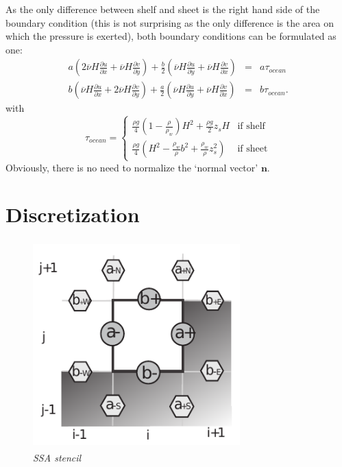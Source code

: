 \documentclass[a4paper,10pt]{article}
\begin{document}
As the only difference between shelf and sheet is the right hand side of the boundary condition (this is not surprising as the only difference is the area on which the pressure is exerted), both boundary conditions can be formulated as one:
\begin{eqnarray}%
a\left(2\overline{\nu}H\frac{\partial u}{\partial x}+\overline{\nu}H\frac{\partial v}{\partial y}  \right) + \frac{b}{2} \left(\overline{\nu}H\frac{\partial u}{\partial y} + \overline{\nu}H\frac{\partial v}{\partial x} \right) & =  & a\tau_{ocean} \label{BC1}\\  
 b\left(\overline{\nu}H\frac{\partial u}{\partial x}+2\overline{\nu}H\frac{\partial v}{\partial y}  \right) + \frac{a}{2} \left(\overline{\nu}H\frac{\partial u}{\partial y} + \overline{\nu}H\frac{\partial v}{\partial x} \right) & = & b\tau_{ocean}. \label{BC2}
\end{eqnarray}
with 
\begin{equation}
\tau_{ocean} = \left\{
\begin{array}{ll}
\frac{\rho g}{4}\left(1-\frac{\rho}{\rho_w}\right)H^2 + \frac{\rho g}{2}z_sH  & \text{if shelf} \\
\frac{\rho g}{4}\left(H^2-\frac{\rho_w}{\rho}b^2+\frac{\rho_w}{\rho}z_s^2 \right) & \text{if sheet}
\end{array} \right.
\end{equation}
Obviously, there is no need to normalize the `normal vector' $\mathbf{n}$.
\section{Discretization}

\begin{figure}[htb]
\begin{center}
\includegraphics[height=80mm, width=8cm]{f07.pdf}
\caption{\emph{SSA stencil}}
\label{result3}
\end{center}
\end{figure}
\end{document}
